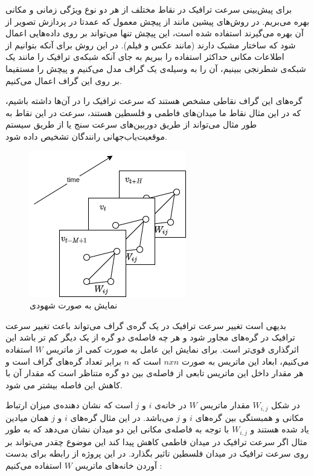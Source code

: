 \documentclass{article}
\begin{document}
برای پیش‌بینی سرعت ترافیک در نقاط مختلف از هر دو نوع ویژگی زمانی و مکانی بهره می‌بریم.
در روش‌های پیشین مانند  از پیچش معمول که عمدتا در پردازش تصویر از آن بهره می‌گیرند استفاده شده است، این پیچش تنها می‌تواند بر روی داده‌هایی اعمال شود که ساختار مشبک دارند (مانند عکس و فیلم).
در این روش برای آنکه بتوانیم از اطلاعات مکانی حداکثر استفاده را ببریم به جای آنکه شبکه‌ی ترافیک را مانند یک شبکه‌‌ی شطرنجی ببینیم،
آن را به وسیله‌ی یک گراف مدل می‌کنیم و پیچش را مستقیما بر روی این گراف اعمال می‌کنیم.

گره‌های این گراف نقاطی مشخص هستند که سرعت ترافیک را در آن‌ها داشته باشیم، که در این مثال نقاط ما میدان‌های فاطمی و فلسطین هستند،
سرعت در این نقاط به طور مثال می‌تواند از طریق دوربین‌های سرعت سنج یا از طریق سیستم موقعیت‌‌یاب‌جهانی رانندگان تشخیص داده شود.


\begin{figure}
  \includegraphics{./images/base.png}
  \centering
  \caption{
نمایش  به صورت شهودی
}
  \label{fig:base}
\end{figure}

بدیهی است تغییر سرعت ترافیک در یک گره‌ی گراف می‌تواند باعث تغییر سرعت ترافیک در گره‌های مجاور شود و هر چه فاصله‌ی دو گره از یک دیگر کم تر باشد این اثرگذاری قوی‌تر است.
برای نمایش این عامل به صورت کمی از ماتریس $W$ استفاده می‌کنیم، ابعاد این ماتریس به صورت $n x n$ است که $n$ برابر تعداد گره‌های گراف است و هر مقدار داخل این ماتریس تابعی از فاصله‌ی بین دو گره متناظر است که مقدار آن با کاهش این فاصله بیشتر می شود.

در شکل  $W_{i,j}$ مقدار ماتریس $W$ در خانه‌ی $i$ و $j$ است که نشان دهنده‌ی میزان ارتباط مکانی و همبستگی بین گره‌های $i$ و $j$ می‌باشد.
در این مثال گره‌های $i$ و $j$ همان میادین یاد شده هستند و $W_{i,j}$ با توجه به فاصله‌ی مکانی این دو میدان نشان می‌دهد که
به طور مثال اگر سرعت ترافیک در میدان فاطمی کاهش پیدا کند این موضوع چقدر می‌تواند بر روی سرعت ترافیک در میدان فلسطین تاثیر بگذارد.
در این پروژه از رابطه‌  برای بدست آوردن خانه‌های ماتریس $W$ استفاده می‌کنیم :
\end{document}
